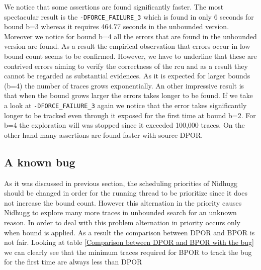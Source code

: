 

We notice that some assertions are found significantly faster. The most spectacular result is the \verb|-DFORCE_FAILURE_3| which is found in only 6 seconds for bound b=3 whereas it requires 464.77 seconds in the unbounded version. Moreover we notice for bound b=4 all the errors that are found in the unbounded version are
found. As a result the empirical observation that errors occur in low bound count seems to be confirmed. However, we have to underline that these are contrived
errors aiming to verify the correctness of the rcu and as a result they cannot be regarded as substantial evidences. As it is expected for larger bounds (b=4) the number of traces
grows exponentially. An other impressive result is that when the bound grows larger the errors takes longer to be found. If we take a look at \verb|-DFORCE_FAILURE_3| again we notice that the error
takes significantly longer to be tracked even through it exposed for the first time at bound b=2. For b=4 the exploration will was stopped since it exceeded 100,000 traces.
On the other hand many assertions are found faster with source-DPOR.

\subsection{A known bug}
As it was discussed in previous section, the scheduling priorities of Nidhugg should be changed in order for the running thread to be prioritize since it does not
increase the bound count. However this alternation in the priority causes Nidhugg to explore many more traces in unbounded search for an unknown reason. In order to deal with
this problem alternation in priority occurs only when bound is applied. As a result the comparison between DPOR and BPOR is not fair. Looking at table \ref{Comparison between DPOR and BPOR with the bug}
we can clearly see that the minimum traces required for BPOR to track the bug for the first time are always less than DPOR

